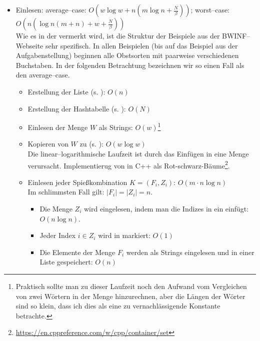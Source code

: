 \begin{itemize}
  \item Einlesen: average--case: $O(w \log w + n (m \log n + \frac{N}{\beta}))$;
  worst--case: $O(n(\log n(m + n) + w + \frac{N}{\beta}))$\\
  Wie es in der  vermerkt wird, ist die Struktur der Beispiele aus der BWINF--Webseite
  sehr spezifisch.
  In allen Beispielen (bis auf das Beispiel aus der Aufgabenstellung) beginnen alle Obstsorten
  mit paarweise verschiedenen Buchstaben. In der folgenden Betrachtung bezeichnen wir so einen 
  Fall als den average--case.

  \begin{itemize}
    \item Erstellung der Liste  (s. ): $O(n)$

    \item Erstellung der Hashtabelle (s. ): $O(N)$

    \item Einlesen der Menge $W$ als Strings: $O(w)$\footnote{Praktisch sollte man zu dieser Laufzeit noch den Aufwand vom Vergleichen von zwei Wörtern in der Menge hinzurechnen, aber die Längen der Wörter sind so klein, dass ich dies als eine zu vernachlässigende Konstante betrachte.\label{foot:vergleich-aufwand}}

    \item Kopieren von $W$ zu  (s. ): $O(w \log w)$\\
    Die linear--logarithmische Laufzeit ist durch das Einfügen in eine Menge verursacht.
    Implementierug von  in C++ als Rot-schwarz-Bäume\footnote{\href{https://en.cppreference.com/w/cpp/container/set}{https://en.cppreference.com/w/cpp/container/set}}. 

    \item Einlesen jeder Spießkombination $K = (F_i, Z_i)$: $O(m \cdot n \log n)$\\
    Im schlimmsten Fall gilt: $|F_i| = |Z_i| = n$.
    \begin{itemize}
      \item Die Menge $Z_i$ wird eingelesen, indem man die Indizes in ein  einfügt: $O(n \log n)$.

      \item Jeder Index $i \in Z_i$ wird in  markiert: $O(1)$

      \item Die Elemente der Menge $F_i$ werden als Strings eingelesen und in einer Liste gespeichert: $O(n)$


\end{itemize}
\end{itemize}
\end{itemize}
